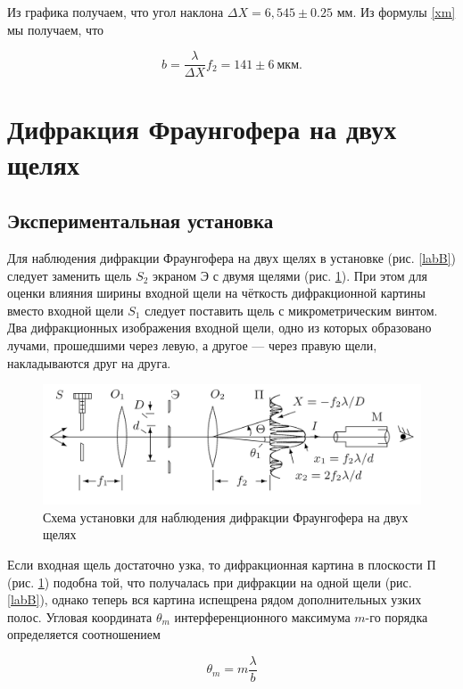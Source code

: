 \documentclass[a4paper,12pt]{article}
\begin{document}
Из графика получаем, что угол наклона $ \Delta X = 6,545 \pm 0.25$ мм. Из формулы \eqref{xm} мы получаем, что 

\begin{equation}\label{qqq}
b =  \dfrac{\lambda}{\Delta X} f_2 =  141 \pm 6 ~\text{мкм}. 
\end{equation}


\section{Дифракция Фраунгофера на двух щелях}

\subsection{Экспериментальная установка}

Для наблюдения дифракции Фраунгофера на двух щелях в установке (рис. \ref{labB}) следует заменить щель $ S_2 $ экраном Э с двумя щелями
(рис. \ref{labC}). При этом для оценки влияния ширины входной щели на чёткость дифракционной картины вместо входной щели $ S_1 $ следует поставить щель с микрометрическим винтом. Два дифракционных изображения входной щели, одно из которых образовано лучами, прошедшими через левую, а другое --- через правую щели, накладываются друг на друга.

\begin{figure}[h!]
	\centering
	\includegraphics[width=0.8\linewidth]{c.png}
	\caption{Схема установки для наблюдения дифракции Фраунгофера на двух щелях}
	\label{labC}
\end{figure}

Если входная щель достаточно узка, то дифракционная картина
в плоскости П (рис. \ref{labC}) подобна той, что получалась при дифракции
на одной щели (рис. \ref{labB}), однако теперь вся картина испещрена рядом
дополнительных узких полос.
Угловая координата $ \theta_m $ интерференционного максимума $ m $-го порядка определяется соотношением

\begin{equation}\label{}
\theta_m = m \dfrac{\lambda}{b}
\end{equation}
\end{document}
